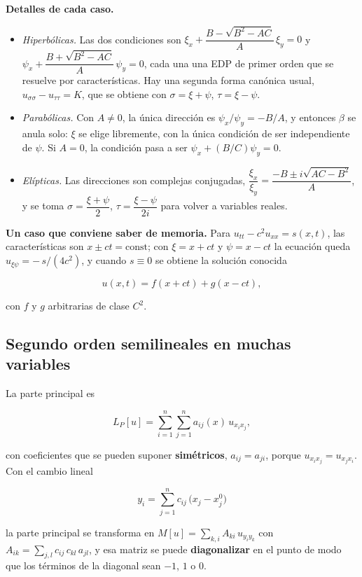 \documentclass[
  spanish,
  a4paper,
]{scrbook}
\providecommand{\tightlist}{%
  \setlength{\itemsep}{0pt}\setlength{\parskip}{0pt}}
\theoremstyle{definition}
\theoremstyle{plain}
\theoremstyle{definition}
\theoremstyle{plain}
\theoremstyle{definition}
\theoremstyle{remark}
\begin{document}
\textbf{Detalles de cada caso.}

\begin{itemize}
\tightlist
\item
  \emph{Hiperbólicas.} Las dos condiciones son
  \(\xi_x + \dfrac{B-\sqrt{B^2-AC}}{A}\,\xi_y = 0\) y
  \(\psi_x + \dfrac{B+\sqrt{B^2-AC}}{A}\,\psi_y = 0\), cada una una EDP
  de primer orden que se resuelve por características. Hay una segunda
  forma canónica usual, \(u_{\sigma\sigma} - u_{\tau\tau} = K\), que se
  obtiene con \(\sigma = \xi+\psi\), \(\tau = \xi-\psi\).
\item
  \emph{Parabólicas.} Con \(A\neq0\), la única dirección es
  \(\psi_x/\psi_y = -B/A\), y entonces \(\beta\) se anula solo: \(\xi\)
  se elige libremente, con la única condición de ser independiente de
  \(\psi\). Si \(A = 0\), la condición pasa a ser
  \(\psi_x + (B/C)\psi_y = 0\).
\item
  \emph{Elípticas.} Las direcciones son complejas conjugadas,
  \(\dfrac{\xi_x}{\xi_y} = \dfrac{-B \pm i\sqrt{AC-B^2}}{A}\), y se toma
  \(\sigma = \dfrac{\xi+\psi}{2}\), \(\tau = \dfrac{\xi-\psi}{2i}\) para
  volver a variables reales.
\end{itemize}

\textbf{Un caso que conviene saber de memoria.} Para
\(u_{tt} - c^2u_{xx} = s(x,t)\), las características son
\(x \pm ct = \text{const}\); con \(\xi = x+ct\) y \(\psi = x-ct\) la
ecuación queda \(u_{\xi\psi} = -\,s/(4c^2)\), y cuando \(s\equiv0\) se
obtiene la solución conocida

\[
u(x,t) = f(x+ct) + g(x-ct),
\]

con \(f\) y \(g\) arbitrarias de clase \(C^2\).

\subsection{Segundo orden semilineales en muchas
variables}\label{sec-resumen-6}

La parte principal es

\[
L_P[u] = \sum_{i=1}^{n}\sum_{j=1}^{n} a_{ij}(x)\,u_{x_ix_j} ,
\]

con coeficientes que se pueden suponer \textbf{simétricos},
\(a_{ij}=a_{ji}\), porque \(u_{x_ix_j} = u_{x_jx_i}\). Con el cambio
lineal

\[
y_i = \sum_{j=1}^{n} c_{ij}\,\big(x_j - x_j^0\big)
\]

la parte principal se transforma en
\(M[u] = \sum_{k,i} A_{ki}\,u_{y_iy_k}\) con
\(A_{ik} = \sum_{j,l} c_{ij}\,c_{kl}\,a_{jl}\), y esa matriz se puede
\textbf{diagonalizar} en el punto de modo que los términos de la
diagonal sean \(-1\), \(1\) o \(0\).
\end{document}

